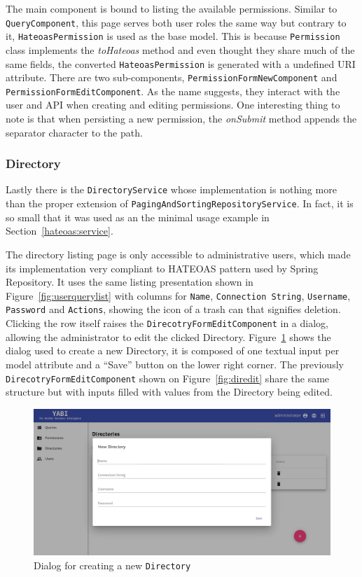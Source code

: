 The main component is bound to listing the available permissions. Similar to \texttt{QueryComponent}, this page serves both user roles the same way but contrary to it, \texttt{HateoasPermission} is used as the base model. This is because \texttt{Permission} class implements the \textit{toHateoas} method and even thought they share much of the same fields, the converted \texttt{HateoasPermission} is generated with a undefined \gls{URI} attribute. There are two sub-components, \texttt{PermissionFormNewComponent} and \texttt{PermissionFormEditComponent}. As the name suggests, they interact with the user and \gls{API} when creating and editing permissions. One interesting thing to note is that when persisting a new permission, the \textit{onSubmit} method appends the separator character to the path.

\subsubsection{Directory}
Lastly there is the \texttt{DirectoryService} whose implementation is nothing more than the proper extension of \texttt{PagingAndSortingRepositoryService}. In fact, it is so small that it was used as an the minimal usage example in Section~\ref{hateoas:service}.

The directory listing page is only accessible to administrative users, which made its implementation very compliant to  \gls{HATEOAS} pattern used by Spring Repository. It uses the same listing presentation shown in Figure~\ref{fig:userquerylist} with columns for \texttt{Name}, \texttt{Connection String}, \texttt{Username}, \texttt{Password} and \texttt{Actions}, showing the icon of a trash can that signifies deletion. Clicking the row itself raises the \texttt{DirecotryFormEditComponent} in a dialog, allowing the administrator to edit the clicked Directory.
Figure~\ref{fig:dirnew} shows the dialog used to create a new Directory, it is composed of one textual input per model attribute and a ``Save'' button on the lower right corner. The previously \texttt{DirecotryFormEditComponent} shown on Figure~\ref{fig:diredit} share the same structure but with inputs filled with values from the Directory being edited.

\begin{figure}
  \centering
  \includegraphics[width=.8\textwidth]{images/screenshots/directory/directory-new}
  \caption{Dialog for creating a new \texttt{Directory}}\label{fig:dirnew}
\end{figure}

